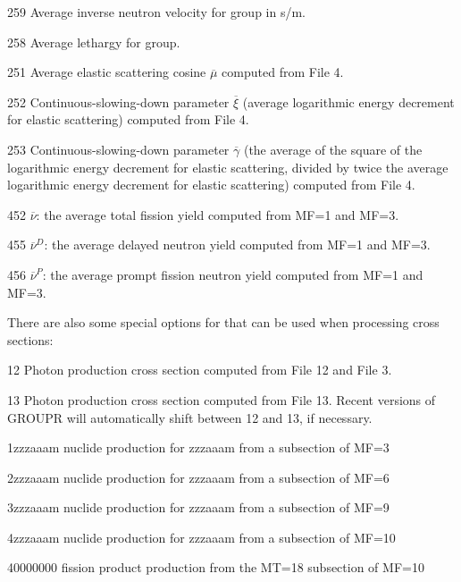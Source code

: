 \begin{list}{ }{=.25in\leftmargin=1in=.75in}
\begin{singlespace}
\item[\underbar{\cword{mtd}}] 
\item[259] Average inverse neutron velocity for group in s/m.
\item[258] Average lethargy for group.
\item[251] Average elastic scattering cosine $\overline\mu$
               computed from File 4.
\item[252] Continuous-slowing-down parameter $\overline\xi$
               (average logarithmic energy decrement for elastic
               scattering) computed from File 4.
\item[253] Continuous-slowing-down parameter $\overline\gamma$
               (the average of the square of the logarithmic energy
               decrement for elastic scattering, divided by twice the
               average logarithmic energy decrement for elastic
               scattering) computed from File 4.
\item[452] $\overline\nu$: the average total fission yield
               computed from MF=1 and MF=3.
\item[455] $\overline\nu^D$: the average delayed neutron yield
               computed from MF=1 and MF=3.
\item[456] $\overline\nu^P$: the average prompt fission neutron
               yield computed from MF=1 and MF=3.
\end{singlespace}
\end{list}

\noindent
There are also some special options for  that can
be used when processing cross sections:

\begin{list}{ }{=.25in\leftmargin=1in=.75in}
\begin{singlespace}

\item[\underbar{\cword{mfd}}] 
\item[12] Photon production cross section computed from File 12 and File 3.
\item[13] Photon production cross section computed from File 13.
          Recent versions of GROUPR will automatically shift
          between 12 and 13, if necessary.
\item[1zzzaaam] nuclide production for zzzaaam from a subsection of MF=3
\item[2zzzaaam] nuclide production for zzzaaam from a subsection of MF=6
\item[3zzzaaam] nuclide production for zzzaaam from a subsection of MF=9
\item[4zzzaaam] nuclide production for zzzaaam from a subsection of MF=10
\item[40000000] fission product production from the MT=18 subsection of MF=10
\end{singlespace}
\end{list}

